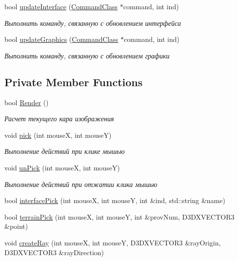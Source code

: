 \begin{DoxyCompactItemize}
bool \hyperlink{class_graphics_class_a62eda5fcca2084d6e7fb05fa1ace5b10}{update\+Interface} (\hyperlink{class_command_class}{Command\+Class} $\ast$command, int ind)
\begin{DoxyCompactList}\small\item\em Выполнить команду, связанную с обновлением интерфейса \end{DoxyCompactList}\item 
bool \hyperlink{class_graphics_class_a7f3d89fdef4c128a163cae8602da8112}{update\+Graphics} (\hyperlink{class_command_class}{Command\+Class} $\ast$command, int ind)
\begin{DoxyCompactList}\small\item\em Выполнить команду, связанную с обновлением графики \end{DoxyCompactList}\end{DoxyCompactItemize}
\subsection*{Private Member Functions}
\begin{DoxyCompactItemize}
\item 
bool \hyperlink{class_graphics_class_a08f0de818545ce88548068956210d62c}{Render} ()
\begin{DoxyCompactList}\small\item\em Расчет текущего кара изображения \end{DoxyCompactList}\item 
void \hyperlink{class_graphics_class_afb77af0fd38144596ef14200d22e5a56}{pick} (int mouseX, int mouseY)
\begin{DoxyCompactList}\small\item\em Выполнение действий при клике мышью \end{DoxyCompactList}\item 
void \hyperlink{class_graphics_class_aa63622c6e5c4785eca56ffc1d148e88b}{un\+Pick} (int mouseX, int mouseY)
\begin{DoxyCompactList}\small\item\em Выполнение действий при отжатии клика мышью \end{DoxyCompactList}\item 
bool \hyperlink{class_graphics_class_a2a4254477fe33e4a44e823d2a0703c38}{interface\+Pick} (int mouseX, int mouseY, int \&ind, std\+::string \&name)
\item 
bool \hyperlink{class_graphics_class_a6ef671ab668663783ee4da691d03d9d5}{terrain\+Pick} (int mouseX, int mouseY, int \&prov\+Num, D3\+D\+X\+V\+E\+C\+T\+O\+R3 \&point)
\item 
void \hyperlink{class_graphics_class_a6e6b448c0046c5bee0e830e40e332ba3}{create\+Ray} (int mouseX, int mouseY, D3\+D\+X\+V\+E\+C\+T\+O\+R3 \&ray\+Origin, D3\+D\+X\+V\+E\+C\+T\+O\+R3 \&ray\+Direction)
\end{DoxyCompactItemize}
